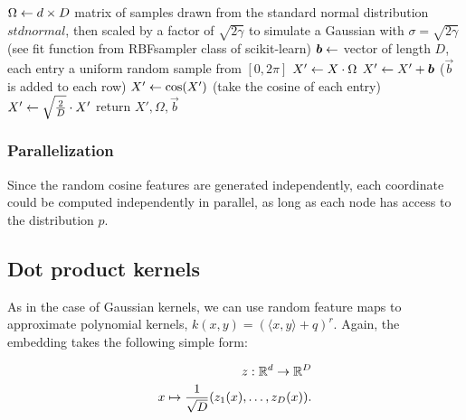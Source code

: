 \begin{algorithm}

\begin{algorithmic}[1]
	\State $\Omega \leftarrow d\times D $ matrix of samples drawn from the standard normal distribution $ stdnormal$,
    then scaled by a factor of $\sqrt{2\gamma}$ to simulate a Gaussian with $\sigma=\sqrt{2\gamma}$
    (see fit function from RBFsampler class of scikit-learn)
	\State $\boldsymbol{b} \leftarrow$ vector of length $D$, each entry a uniform random sample from $[0,2\pi]$
	\State $X' \leftarrow  X\cdot \Omega$
	\State $X' \leftarrow X' + \boldsymbol{b} $ ($\vec{b}$ is added to each row)
	\State $X' \leftarrow \cos(X')$ (take the cosine of each entry)
	\State $X' \leftarrow \sqrt{\frac{2}{D}}\cdot X'$
	\State return $X', \Omega, \vec{b}$
\end{algorithmic}

\end{algorithm}


\subsubsection{Parallelization}
Since the random cosine features are generated independently, each coordinate
could be computed independently in parallel, as long as each node has access to
the distribution $p$.


\subsection{Dot product kernels}

As in the case of Gaussian kernels, we can use random feature maps to
approximate polynomial kernels,  $k(x,y)=(\langle x,y\rangle+q)^r$. Again, the
embedding takes the following simple form:

\begin{align*}
z: \mathbb{R}^d\to \mathbb{R}^D\\
x\mapsto \frac{1}{\sqrt{D}} (z_1(x), \ldots, z_D(x)).
\end{align*}

